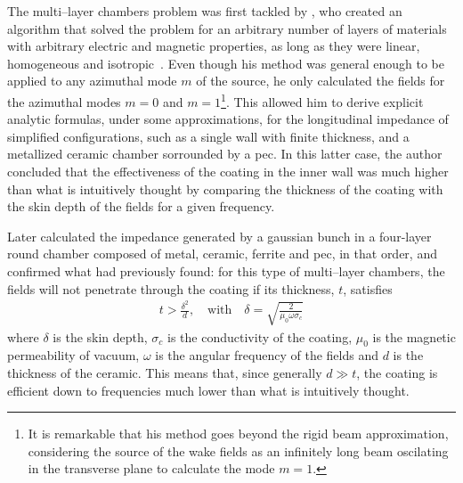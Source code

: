     The multi--layer chambers problem was first tackled by , who created an algorithm that solved the problem for an arbitrary number of layers of materials with arbitrary electric and magnetic properties, as long as they were linear, homogeneous and isotropic~\cite{Zotter1969,Zotter1969a,Zotter1970}. Even though his method was general enough to be applied to any azimuthal mode $m$ of the source, he only calculated the fields for the azimuthal modes $m=0$ and $m=1$\footnote{It is remarkable that his method goes beyond the rigid beam approximation, considering the source of the wake fields as an infinitely long beam oscilating in the transverse plane to calculate the mode $m=1$.}. This allowed him to derive explicit analytic formulas, under some approximations, for the longitudinal impedance of simplified configurations, such as a single wall with finite thickness, and a metallized ceramic chamber sorrounded by a \gls{pec}. In this latter case, the author concluded that the effectiveness of the coating in the inner wall was much higher than what is intuitively thought by comparing the thickness of the coating with the skin depth of the fields for a given frequency.

    Later  calculated the impedance generated by a gaussian bunch in a four-layer round chamber composed of metal, ceramic, ferrite and \gls{pec}, in that order, and confirmed what  had previously found: for this type of multi--layer chambers, the fields will not penetrate through the coating if its thickness, $t$, satisfies
    \begin{align}
        t > \frac{\delta^2}{d}, \quad\text{with}\quad
        \delta = \sqrt{\frac{2}{\mu_0\omega\sigma_c}}
    \end{align}
    where $\delta$ is the skin depth, $\sigma_c$ is the conductivity of the coating, $\mu_0$ is the magnetic permeability of vacuum, $\omega$ is the angular frequency of the fields and $d$ is the thickness of the ceramic. This means that, since generally $d\gg t$, the coating is efficient down to frequencies much lower than what is intuitively thought.

